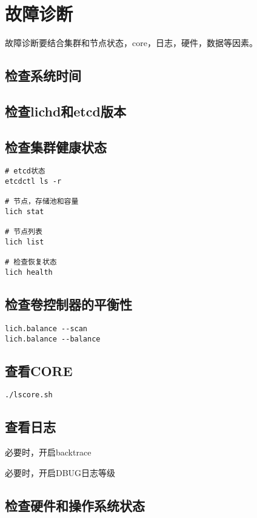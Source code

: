 \section{故障诊断}

故障诊断要结合集群和节点状态，core，日志，硬件，数据等因素。

\subsection{检查系统时间}

\subsection{检查lichd和etcd版本}

\subsection{检查集群健康状态}

\begin{lstlisting}
# etcd状态
etcdctl ls -r

# 节点，存储池和容量
lich stat

# 节点列表
lich list

# 检查恢复状态
lich health
\end{lstlisting}

\subsection{检查卷控制器的平衡性}

\begin{lstlisting}
lich.balance --scan
lich.balance --balance
\end{lstlisting}

\subsection{查看CORE}

\begin{lstlisting}
./lscore.sh
\end{lstlisting}

\subsection{查看日志}

必要时，开启backtrace

必要时，开启DBUG日志等级

\subsection{检查硬件和操作系统状态}

